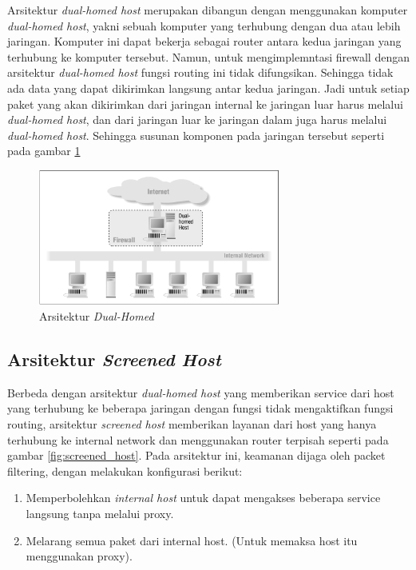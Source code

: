Arsitektur \textit{dual-homed host} merupakan dibangun dengan menggunakan komputer \textit{dual-homed host}, yakni sebuah komputer yang terhubung dengan dua atau lebih jaringan. Komputer ini dapat bekerja sebagai router antara kedua jaringan yang terhubung ke komputer tersebut. Namun, untuk mengimplemntasi firewall dengan arsitektur \textit{dual-homed host} fungsi routing ini tidak difungsikan. Sehingga tidak ada data yang dapat dikirimkan langsung antar kedua jaringan. Jadi untuk setiap paket yang akan dikirimkan dari jaringan internal ke jaringan luar harus melalui \textit{dual-homed host}, dan dari jaringan luar ke jaringan dalam juga harus melalui \textit{dual-homed host}. Sehingga susunan komponen pada jaringan tersebut seperti pada gambar \ref{fig:dual_homed}

\begin{figure}[H]
	\centering
	\includegraphics[width=300px]{resources/dual_homed.png}
	\caption{Arsitektur \textit{Dual-Homed}}
	\label{fig:dual_homed}
\end{figure}

\subsection{Arsitektur \textit{Screened Host}}

Berbeda dengan arsitektur \textit{dual-homed host} yang memberikan service dari host yang terhubung ke beberapa jaringan dengan fungsi tidak mengaktifkan fungsi routing, arsitektur \textit{screened host} memberikan layanan dari host yang hanya terhubung ke internal network dan menggunakan router terpisah seperti pada  gambar \ref{fig:screened_host}. Pada arsitektur ini, keamanan dijaga oleh packet filtering, dengan melakukan konfigurasi berikut:

\begin{enumerate}
\item Memperbolehkan \textit{internal host} untuk dapat mengakses beberapa service langsung tanpa melalui proxy.
\item Melarang semua paket dari internal host. (Untuk memaksa host itu menggunakan proxy).
\end{enumerate}

